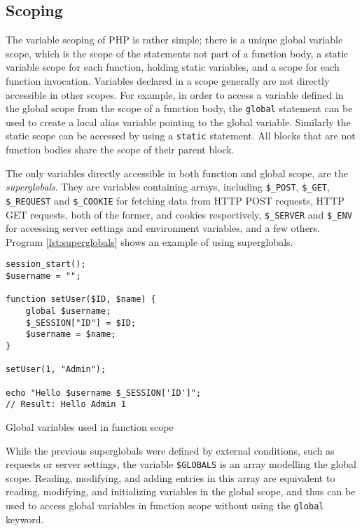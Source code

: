 \subsection{Scoping}
\label{sec:backg_scoping}

The variable scoping of PHP is rather simple; there is a unique global variable scope, which is the scope of the statements not part of a function body, a static variable scope for each function, holding static variables, and a scope for each function invocation. Variables declared in a scope generally are not directly accessible in other scopes. For example, in order to access a variable defined in the global scope from the scope of a function body, the \texttt{global} statement can be used to create a local alias variable pointing to the global variable. Similarly the static scope can be accessed by using a \texttt{static} statement. All blocks that are not function bodies share the scope of their parent block.

The only variables directly accessible in both function and global scope, are the \emph{superglobals}. They are variables containing arrays, including \texttt{\$\_POST}, \texttt{\$\_GET}, \texttt{\$\_REQUEST} and \texttt{\$\_COOKIE} for fetching data from HTTP POST requests, HTTP GET requests, both of the former, and cookies respectively, \texttt{\$\_SERVER} and \texttt{\$\_ENV} for accessing server settings and environment variables, and a few others. Program \ref{lst:superglobals} shows an example of using superglobals.

\begin{program}
\begin{lstlisting}
session_start();
$username = "";

function setUser($ID, $name) {
    global $username;
    $_SESSION["ID"] = $ID;
    $username = $name;
}

setUser(1, "Admin");

echo "Hello $username $_SESSION['ID']"; 
// Result: Hello Admin 1
\end{lstlisting}
\caption{Global variables used in function scope}
\label{lst:superglobals}
\end{program}

While the previous superglobals were defined by external conditions, such as requests or server settings, the variable \texttt{\$GLOBALS} is an array modelling the global scope. Reading, modifying, and adding entries in this array are equivalent to reading, modifying, and initializing variables in the global scope, and thus can be used to access global variables in function scope without using the \texttt{global} keyword.


